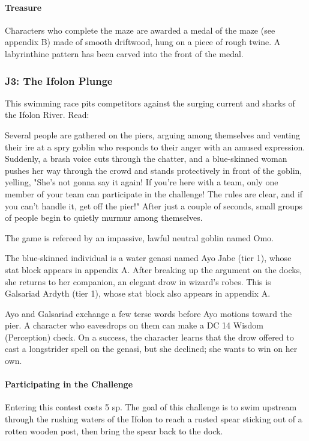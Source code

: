 \documentclass[10pt,a4paper,twoside,twocolumn,openany,nodeprecatedcode]{dndbook}
\begin{document}
\paragraph{Treasure}
Characters who complete the maze are awarded a medal of the maze (see appendix B) made of smooth driftwood, hung on a piece of rough twine. A labyrinthine pattern has been carved into the front of the medal.

\subsubsection{J3: The Ifolon Plunge}
This swimming race pits competitors against the surging current and sharks of the Ifolon River. Read:

\begin{DndReadAloud}{}
Several people are gathered on the piers, arguing among themselves and venting their ire at a spry goblin who responds to their anger with an amused expression. Suddenly, a brash voice cuts through the chatter, and a blue-skinned woman pushes her way through the crowd and stands protectively in front of the goblin, yelling, "She's not gonna say it again! If you're here with a team, only one member of your team can participate in the challenge! The rules are clear, and if you can't handle it, get off the pier!" After just a couple of seconds, small groups of people begin to quietly murmur among themselves.

\end{DndReadAloud}

The game is refereed by an impassive, lawful neutral goblin named Omo.

The blue-skinned individual is a water genasi named Ayo Jabe (tier 1), whose stat block appears in appendix A. After breaking up the argument on the docks, she returns to her companion, an elegant drow in wizard's robes. This is Galsariad Ardyth (tier 1), whose stat block also appears in appendix A.

Ayo and Galsariad exchange a few terse words before Ayo motions toward the pier. A character who eavesdrops on them can make a DC 14 Wisdom (Perception) check. On a success, the character learns that the drow offered to cast a longstrider spell on the genasi, but she declined; she wants to win on her own.

\paragraph{Participating in the Challenge}
Entering this contest costs 5 sp. The goal of this challenge is to swim upstream through the rushing waters of the Ifolon to reach a rusted spear sticking out of a rotten wooden post, then bring the spear back to the dock.
\end{document}
